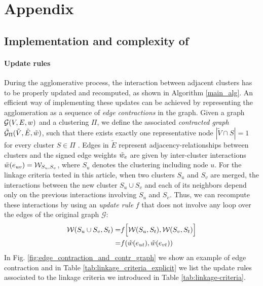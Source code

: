 


\section{Appendix}

\subsection{Implementation and complexity of \algname{}} \label{sec:detailed_impl}

\paragraph*{Update rules} During the agglomerative process, the interaction between adjacent clusters has to be properly updated and recomputed, as shown in Algorithm \ref{main_alg}.  
An efficient way of implementing these updates can be achieved by representing the agglomeration as a sequence of \emph{edge contractions} in the graph. Given a graph $\mathcal{G}(V,E,w)$ and a clustering $\Pi$, we define the associated \emph{contracted graph} $\tilde{\mathcal{G}}_\Pi(\tilde{V}, \tilde{E}, \tilde{w})$, such that there exists exactly one representative node $|\tilde{V} \cap S| = 1$ for every cluster $S \in \Pi$ . Edges in $\tilde{E}$ represent adjacency-relationships between clusters 
and the signed edge weights $\tilde{w}_e$ are given by inter-cluster interactions $\tilde{w}(e_{uv})=\mathcal{W}_{S_u,S_v}$, where $S_u$ denotes the clustering including node $u$. 
For the linkage criteria tested in this article, when two clusters $S_u$ and $S_v$ are merged, the interactions between the new cluster $S_u \cup S_v$ and each of its neighbors depend only on the previous interactions involving $S_u$ and $S_v$. Thus, we can recompute these interactions by using an \emph{update rule} $f$ that does not involve any loop over the edges of the original graph $\mathcal{G}$:
\begin{align}
  \mathcal{W}(S_u \cup S_v,S_t) =& f\Big[ \mathcal{W}(S_u,S_t), \mathcal{W}(S_v,S_t) \Big] \\
  =& f(\tilde{w}(e_{ut}), \tilde{w}(e_{vt})) 
\end{align}
In Fig. \ref{fig:edge_contraction_and_contr_graph} we show an example of edge contraction and in Table \ref{tab:linkage_criteria_explicit} we list the update rules associated to the linkage criteria we introduced in Table \ref{tab:linkage-criteria}.

